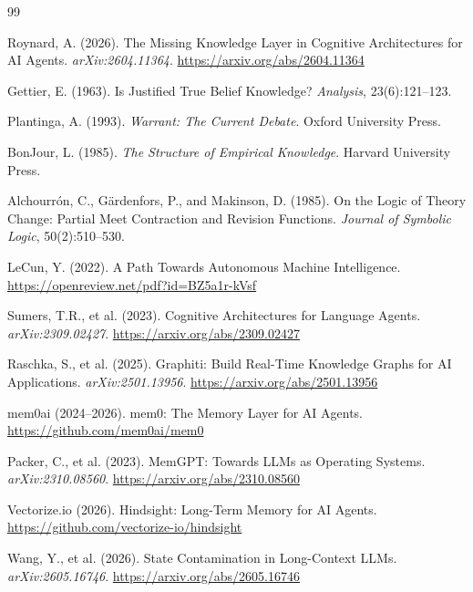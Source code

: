 \documentclass[11pt,letterpaper]{article}
\begin{document}

\begin{thebibliography}{99}

Roynard, A. (2026).
\newblock The Missing Knowledge Layer in Cognitive Architectures for AI Agents.
\newblock \textit{arXiv:2604.11364}. \url{https://arxiv.org/abs/2604.11364}

Gettier, E. (1963).
\newblock Is Justified True Belief Knowledge?
\newblock \textit{Analysis}, 23(6):121--123.

Plantinga, A. (1993).
\newblock \textit{Warrant: The Current Debate}.
\newblock Oxford University Press.

BonJour, L. (1985).
\newblock \textit{The Structure of Empirical Knowledge}.
\newblock Harvard University Press.

Alchourr{\'o}n, C., G{\"a}rdenfors, P., and Makinson, D. (1985).
\newblock On the Logic of Theory Change: Partial Meet Contraction and Revision Functions.
\newblock \textit{Journal of Symbolic Logic}, 50(2):510--530.

LeCun, Y. (2022).
\newblock A Path Towards Autonomous Machine Intelligence.
\newblock \url{https://openreview.net/pdf?id=BZ5a1r-kVsf}

Sumers, T.R., et al. (2023).
\newblock Cognitive Architectures for Language Agents.
\newblock \textit{arXiv:2309.02427}. \url{https://arxiv.org/abs/2309.02427}

Raschka, S., et al. (2025).
\newblock Graphiti: Build Real-Time Knowledge Graphs for AI Applications.
\newblock \textit{arXiv:2501.13956}. \url{https://arxiv.org/abs/2501.13956}

mem0ai (2024--2026).
\newblock mem0: The Memory Layer for AI Agents.
\newblock \url{https://github.com/mem0ai/mem0}

Packer, C., et al. (2023).
\newblock MemGPT: Towards LLMs as Operating Systems.
\newblock \textit{arXiv:2310.08560}. \url{https://arxiv.org/abs/2310.08560}

Vectorize.io (2026).
\newblock Hindsight: Long-Term Memory for AI Agents.
\newblock \url{https://github.com/vectorize-io/hindsight}

Wang, Y., et al. (2026).
\newblock State Contamination in Long-Context LLMs.
\newblock \textit{arXiv:2605.16746}. \url{https://arxiv.org/abs/2605.16746}


\end{thebibliography}
\end{document}

